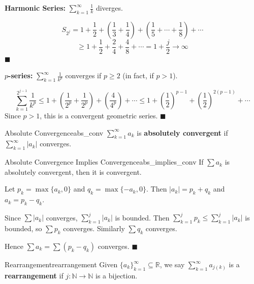 \documentclass[11pt, letterpaper, openany]{book}
\renewenvironment{proof}[1][\proofname]{%
  \tcolorbox[blanker, breakable, left=1em,
    before skip=1em, after skip=1em,
    borderline west={2pt}{0pt}{MagicTeal!50},
    colback=MagicCream,
    before upper={\textcolor{MagicTeal}{\sffamily\bfseries #1.}\space}
  ]%
}{%
  \hfill\textcolor{MagicTeal}{\ensuremath{\blacksquare}}\endtcolorbox%
}
\begin{document}
\begin{example}
\textbf{Harmonic Series:} $\sum_{k=1}^\infty \frac{1}{k}$ diverges.

\begin{proof}
\[S_{2^j} = 1 + \frac{1}{2} + \left(\frac{1}{3} + \frac{1}{4}\right) + \left(\frac{1}{5} + \cdots + \frac{1}{8}\right) + \cdots\]
\[\geq 1 + \frac{1}{2} + \frac{2}{4} + \frac{4}{8} + \cdots = 1 + \frac{j}{2} \to \infty\]
\end{proof}
\end{example}

\begin{example}
\textbf{$p$-series:} $\sum_{k=1}^\infty \frac{1}{k^p}$ converges if $p \geq 2$ (in fact, if $p > 1$).

\begin{proof}
\[\sum_{k=1}^{2^{j-1}} \frac{1}{k^p} \leq 1 + \left(\frac{1}{2^p} + \frac{1}{2^p}\right) + \left(\frac{4}{4^p}\right) + \cdots \leq 1 + \left(\frac{1}{2}\right)^{p-1} + \left(\frac{1}{2}\right)^{2(p-1)} + \cdots\]
Since $p > 1$, this is a convergent geometric series.
\end{proof}
\end{example}

\begin{defn}{Absolute Convergence}{abs_conv}
$\sum_{k=1}^\infty a_k$ is \textbf{absolutely convergent} if $\sum_{k=1}^\infty |a_k|$ converges.
\end{defn}

\begin{thm}{Absolute Convergence Implies Convergence}{abs_implies_conv}
If $\sum a_k$ is absolutely convergent, then it is convergent.
\end{thm}

\begin{proof}
Let $p_k = \max\{a_k, 0\}$ and $q_k = \max\{-a_k, 0\}$. Then $|a_k| = p_k + q_k$ and $a_k = p_k - q_k$.

Since $\sum |a_k|$ converges, $\sum_{k=1}^j |a_k|$ is bounded. Then $\sum_{k=1}^j p_k \leq \sum_{k=1}^j |a_k|$ is bounded, so $\sum p_k$ converges. Similarly $\sum q_k$ converges.

Hence $\sum a_k = \sum(p_k - q_k)$ converges.
\end{proof}

\begin{defn}{Rearrangement}{rearrangement}
Given $\{a_k\}_{k=1}^\infty \subseteq \mathbb{R}$, we say $\sum_{k=1}^\infty a_{j(k)}$ is a \textbf{rearrangement} if $j: \mathbb{N} \to \mathbb{N}$ is a bijection.
\end{defn}
\end{document}
